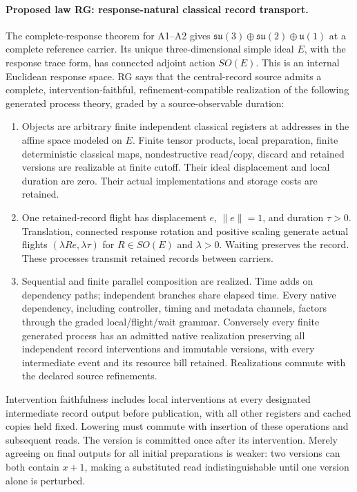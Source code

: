 \paragraph{Proposed law RG: response-natural classical record transport.}
The complete-response theorem for A1--A2 gives
$\mathfrak{su}(3)\oplus\mathfrak{su}(2)\oplus\mathfrak u(1)$ at a complete
reference carrier. Its unique three-dimensional simple ideal $E$, with
the response trace form, has connected adjoint action $SO(E)$.
This is an internal Euclidean response space.
RG says that the central-record source admits a complete,
intervention-faithful, refinement-compatible realization of the following
generated process theory, graded by a source-observable duration:
\begin{enumerate}
\item Objects are arbitrary finite independent classical registers at
addresses in the affine space modeled on $E$. Finite tensor products,
local preparation, finite deterministic classical maps, nondestructive
read/copy, discard and retained versions are realizable at finite cutoff.
Their ideal displacement and local duration are zero. Their actual
implementations and storage costs are retained.
\item One retained-record flight has displacement $e$, $\|e\|=1$, and
duration $\tau>0$. Translation, connected response rotation and positive
scaling generate actual flights $(\lambda Re,\lambda\tau)$ for
$R\in SO(E)$ and $\lambda>0$. Waiting preserves the record. These processes
transmit retained records between carriers.
\item Sequential and finite parallel composition are realized. Time adds
on dependency paths; independent branches share elapsed time. Every native
dependency, including controller, timing and metadata channels, factors
through the graded local/flight/wait grammar. Conversely every finite
generated process has an admitted native realization preserving all
independent record interventions and immutable versions, with every
intermediate event and its resource bill retained. Realizations commute
with the declared source refinements.
\end{enumerate}
Intervention faithfulness includes local interventions at every designated
intermediate record output before publication, with all other registers and
cached copies held fixed. Lowering must commute with insertion of these
operations and subsequent reads. The version is committed once after its
intervention. Merely agreeing on final outputs for all initial preparations
is weaker: two versions can both contain $x+1$, making a substituted read
indistinguishable until one version alone is perturbed.

